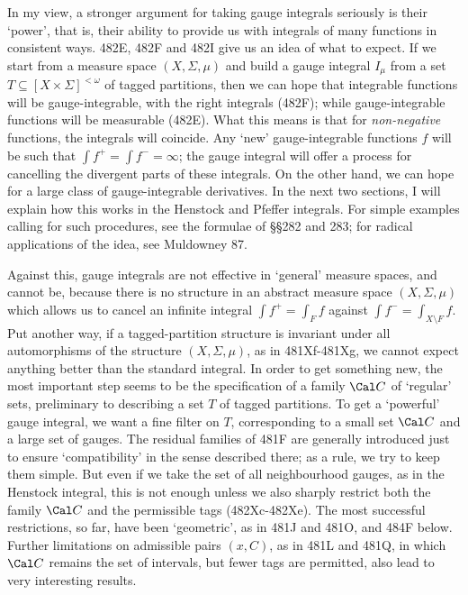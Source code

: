 {In my view, a stronger argument for taking gauge integrals seriously
is their `power', that is, their ability to provide us with integrals of
many functions in consistent ways.   482E, 482F and 482I give us an
idea
of what to expect.   If we start from a measure space $(X,\Sigma,\mu)$
and build a gauge integral $I_{\mu}$ from a set
$T\subseteq[X\times\Sigma]^{<\omega}$ of tagged partitions, then we
can hope that integrable functions will be gauge-integrable, with the
right
integrals (482F);  while gauge-integrable functions will be measurable
(482E).   What this means is that for {\it non-negative} functions,
the integrals will coincide.   Any `new' gauge-integrable functions $f$
will be such that $\int f^+=\int f^-=\infty$;  the gauge integral will
offer
a process for cancelling the divergent parts of these integrals.   On
the other hand, we can hope for a large class of gauge-integrable
derivatives.   In the next two sections, I will explain how this works
in the Henstock and Pfeffer
integrals.   For simple examples calling for such procedures, see the
formulae of \S\S282 and 283;  for radical applications of the idea, see
{\smc Muldowney 87}.

Against this, gauge integrals are not effective in `general' measure
spaces, and cannot be, because there is no structure in an abstract
measure space $(X,\Sigma,\mu)$ which allows us to cancel an infinite
integral $\int f^+=\int_Ff$ against
$\int f^-=\int_{X\setminus F}f$.   Put another way, if a
tagged-partition structure is invariant under all automorphisms of the
structure $(X,\Sigma,\mu)$, as in 481Xf-481Xg, we cannot expect
anything
better than the standard integral.   In order to get something new, the
most important step seems to be the specification of a family
$\Cal C$ of `regular' sets, preliminary to describing a set $T$ of
tagged partitions.   To get a `powerful' gauge integral, we want a fine
filter on $T$, corresponding to a small set $\Cal C$ and a large set of
gauges.   The residual
families of 481F are generally introduced just to ensure `compatibility'
in the sense described there;  as a rule, we try to keep them simple.
But even if we take the set of all neighbourhood gauges, as in the
Henstock integral, this is not enough unless we also sharply restrict
both the family $\Cal C$ and the permissible tags
(482Xc-482Xe).  %
The most successful restrictions, so far, have been `geometric', as in
481J and 481O, and 484F below.   Further limitations on admissible
pairs $(x,C)$,
as in 481L and 481Q, in which $\Cal C$ remains the set of intervals, but
fewer tags are permitted, also lead to very interesting results.

}
